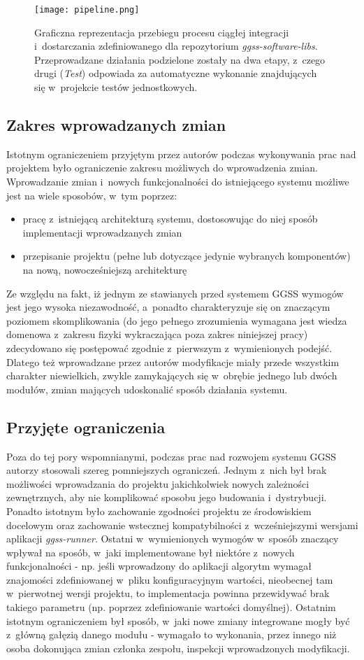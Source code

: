 \begin{figure}[H]
\centering
\texttt{[image: pipeline.png]}
\caption{Graficzna reprezentacja przebiegu procesu ciągłej integracji i~dostarczania zdefiniowanego dla repozytorium \emph{ggss-software-libs}. Przeprowadzane działania podzielone zostały na dwa etapy, z~czego drugi (\emph{Test}) odpowiada za automatyczne wykonanie znajdujących się w~projekcie testów jednostkowych.}
\label{fig:cicd_tests}
\end{figure}

\clearpage
\subsection{Zakres wprowadzanych zmian}
Istotnym ograniczeniem przyjętym przez autorów podczas wykonywania prac nad projektem było ograniczenie zakresu możliwych do wprowadzenia zmian. Wprowadzanie zmian i~nowych funkcjonalności do istniejącego systemu możliwe jest na wiele sposobów, w~tym poprzez: 
\begin{itemize}
    \item pracę z~istniejącą architekturą systemu, dostosowując do niej sposób implementacji wprowadzanych zmian
    \item przepisanie projektu (pełne lub dotyczące jedynie wybranych komponentów) na nową, nowocześniejszą architekturę
\end{itemize}
Ze względu na fakt, iż jednym ze stawianych przed systemem GGSS wymogów jest jego wysoka niezawodność, a~ponadto charakteryzuje się on znaczącym poziomem skomplikowania (do jego pełnego zrozumienia wymagana jest wiedza domenowa z~zakresu fizyki wykraczająca poza zakres niniejszej pracy) zdecydowano się postępować zgodnie z~pierwszym z~wymienionych podejść. Dlatego też wprowadzane przez autorów modyfikacje miały przede wszystkim charakter niewielkich, zwykle zamykających się w~obrębie jednego lub dwóch modułów, zmian mających udoskonalić sposób działania systemu. 

\subsection{Przyjęte ograniczenia}
Poza do tej pory wspomnianymi, podczas prac nad rozwojem systemu GGSS autorzy stosowali szereg pomniejszych ograniczeń. Jednym z~nich był brak możliwości wprowadzania do projektu jakichkolwiek nowych zależności zewnętrznych, aby nie komplikować sposobu jego budowania i~dystrybucji. Ponadto istotnym było zachowanie zgodności projektu ze środowiskiem docelowym oraz zachowanie wstecznej kompatybilności z~wcześniejszymi wersjami aplikacji \emph{ggss-runner}. Ostatni w~wymienionych wymogów w~sposób znaczący wpływał na sposób, w~jaki implementowane był niektóre z~nowych funkcjonalności - np. jeśli wprowadzony do aplikacji algorytm wymagał znajomości zdefiniowanej w~pliku konfiguracyjnym wartości, nieobecnej tam w~pierwotnej wersji projektu, to implementacja powinna przewidywać brak takiego parametru (np. poprzez zdefiniowanie wartości domyślnej). Ostatnim istotnym ograniczeniem był sposób, w~jaki nowe zmiany integrowane mogły być z~główną gałęzią danego modułu - wymagało to wykonania, przez innego niż osoba dokonująca zmian członka zespołu, inspekcji wprowadzonych modyfikacji.

